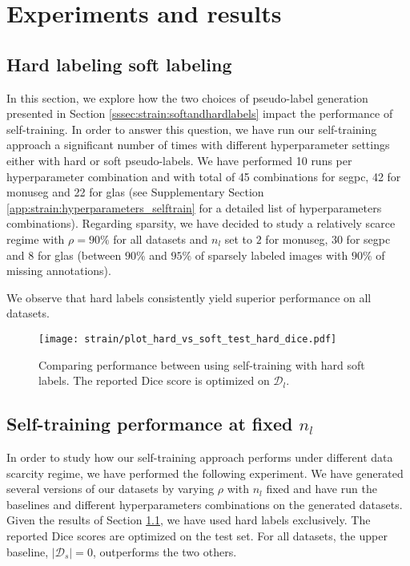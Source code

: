 \section{Experiments and results}
\label{sec:strain:results}

\subsection{Hard labeling \vs soft labeling}
\label{ssec:strain:res:hardvssoft}

In this section, we explore how the two choices of pseudo-label generation presented in Section \ref{sssec:strain:softandhardlabels} impact the performance of self-training. In order to answer this question, we have run our self-training approach a significant number of times with different hyperparameter settings either with hard or soft pseudo-labels. We have performed 10 runs per hyperparameter combination and with total of 45 combinations for \acrshort{segpc}, 42 for \acrshort{monuseg} and 22 for \acrshort{glas} (see Supplementary Section \ref{app:strain:hyperparameters_selftrain} for a detailed list of hyperparameters combinations). Regarding sparsity, we have decided to study a relatively scarce regime with $\rho = 90\%$ for all datasets and $n_l$ set to $2$ for \acrshort{monuseg}, $30$ for \acrshort{segpc} and $8$ for \acrshort{glas} (\ie between $90\%$ and $95\%$ of sparsely labeled images with $90\%$ of missing annotations).    

We observe that hard labels consistently yield superior performance on all datasets. 

\begin{figure}
  \centering
  \texttt{[image: strain/plot\_hard\_vs\_soft\_test\_hard\_dice.pdf]}
  \caption{Comparing performance between using self-training with hard \vs soft labels. The reported Dice score is optimized on $\mathcal{D}_l$.}
  \label{fig:strain:hard_vs_soft}
\end{figure}

\subsection{Self-training performance at fixed $n_l$}

In order to study how our self-training approach performs under different data scarcity regime, we have performed the following experiment. We have generated several versions of our datasets by varying $\rho$ with $n_l$ fixed and have run the baselines and different hyperparameters combinations on the generated datasets. Given the results of Section \ref{ssec:strain:res:hardvssoft}, we have used hard labels exclusively. The reported Dice scores are optimized on the test set. For all datasets, the upper baseline, $|\mathcal{D}_s| = 0$, outperforms the two others. 

